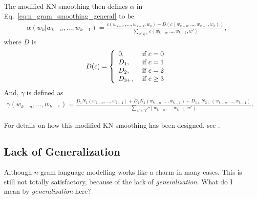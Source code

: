 \documentclass{report}
\begin{document}
The modified KN smoothing then defines $\alpha$ in
Eq.~\eqref{eq:n_gram_smoothing_general} to be
\begin{align*}
    \alpha(w_k | w_{k-n}, \ldots, w_{k-1}) =
    \frac{
        c(w_{k-n}, \ldots, w_{k-1}, w_k) - D(c(w_{k-n}, \ldots, w_{k-1}, w_k))
    }{
        \sum_{w' \in V} c(w_{k-n}, \ldots, w_{k-1}, w')
    },
\end{align*}
where $D$ is
\begin{align*}
    D(c) = \left\{
        \begin{array}{l l}
            0,&\text{ if }c=0 \\
            D_1,&\text{ if }c=1 \\
            D_2,&\text{ if }c=2 \\
            D_{3+},&\text{ if }c\geq 3 \\
        \end{array}
        \right.
\end{align*}
And, $\gamma$ is defined as
\begin{align*}
    \gamma(w_{k-n}, \ldots, w_{k-1})  = 
    \frac{
        D_1 N_1(w_{k-n}, \ldots, w_{k-1}) 
        + D_2 N_2(w_{k-n}, \ldots, w_{k-1})
        + D_{3+} N_{3+}(w_{k-n}, \ldots, w_{k-1})
    }{
        \sum_{w' \in V} c(w_{k-n}, \ldots, w_{k-1}, w')
    }.
\end{align*}

For details on how this modified KN smoothing has been designed, see
\cite{chen1996empirical}.






\subsection{Lack of Generalization}

Although $n$-gram language modelling works like a charm in many cases. This is
still not totally satisfactory, because of the lack of {\em generalization}.
What do I mean by {\em generalization} here?
\end{document}
